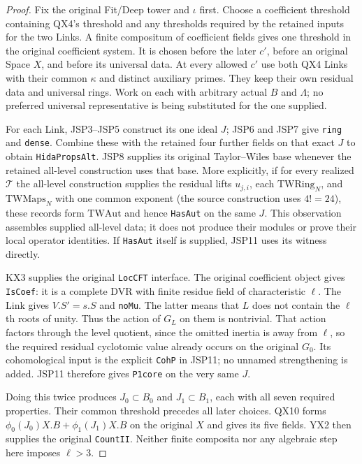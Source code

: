 \begin{proof}
Fix the original Fit/Deep tower and $\iota$ first.
Choose a coefficient threshold containing QX4's threshold
and any thresholds required by the retained inputs for the
two Links. A finite compositum of coefficient fields gives
one threshold in the original coefficient system. It is
chosen before the later $c'$, before an original Space $X$,
and before its universal data. At every allowed $c'$ use
both QX4 Links with their common $\kappa$ and distinct
auxiliary primes. They keep their own residual data and
universal rings. Work on each with arbitrary actual $B$
and $\Lambda$; no preferred universal representative is
being substituted for the one supplied.

For each Link, JSP3--JSP5 construct its one ideal $J$;
JSP6 and JSP7 give \texttt{ring} and \texttt{dense}.
Combine these with the retained four further fields on
that exact $J$ to obtain \texttt{HidaPropsAlt}.
JSP8 supplies its original Taylor--Wiles base whenever
the retained all-level construction uses that base.
More explicitly, if for every realized $\mathcal T$
the all-level construction supplies the residual lifts
$u_{j,i}$, each $\mathrm{TWRing}_N$, and
$\mathrm{TWMaps}_N$ with one common exponent (the source
construction uses $4!=24$), these records form
$\mathrm{TWAut}$ and hence \texttt{HasAut} on the same $J$.
This observation assembles supplied all-level data; it
does not produce their modules or prove their local operator
identities. If \texttt{HasAut} itself is supplied, JSP11
uses its witness directly.

KX3 supplies the original \texttt{LocCFT} interface.
The original coefficient object gives \texttt{IsCoef}:
it is a complete DVR with finite residue field of
characteristic $\ell$. The Link gives $V.S'=s.S$ and
\texttt{noMu}. The latter means that $L$ does not contain
the $\ell$th roots of unity. Thus the action of $G_L$ on
them is nontrivial. That action factors through the level
quotient, since the omitted inertia is away from $\ell$,
so the required residual cyclotomic value already occurs
on the original $G_0$. Its cohomological input is the
explicit \texttt{CohP} in JSP11; no unnamed strengthening
is added. JSP11 therefore gives \texttt{P1core} on the
very same $J$.

Doing this twice produces $J_0\subset B_0$ and
$J_1\subset B_1$, each with all seven required properties.
Their common threshold precedes all later choices.
QX10 forms
$\phi_0(J_0)X.B+\phi_1(J_1)X.B$ on the original $X$
and gives its five fields. YX2 then supplies the original
\texttt{CountII}. Neither finite composita nor any algebraic
step here imposes $\ell>3$.
\end{proof}

